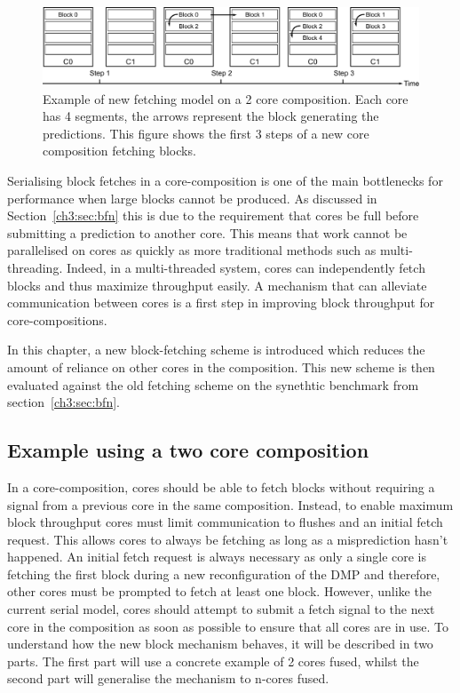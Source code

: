 \begin{figure}[t]
    \centering
    \includegraphics[width=1\textwidth]{chapter3/graphics/fetching-model.pdf}

    \caption{Example of new fetching model on a 2 core composition. Each core has 4 segments, the arrows represent the block generating the predictions. This figure shows the first 3 steps of a new core composition fetching blocks.}
    \label{fig:new_fetch_ex}
\end{figure}

Serialising block fetches in a core-composition is one of the main bottlenecks for performance when large blocks cannot be produced.
As discussed in Section~\ref{ch3:sec:bfn} this is due to the requirement that cores be full before submitting a prediction to another core.
This means that work cannot be parallelised on cores as quickly as more traditional methods such as multi-threading.
Indeed, in a multi-threaded system, cores can independently fetch blocks and thus maximize throughput easily.
A mechanism that can alleviate communication between cores is a first step in improving block throughput for core-compositions.

In this chapter, a new block-fetching scheme is introduced which reduces the amount of reliance on other cores in the composition.
This new scheme is then evaluated against the old fetching scheme on the synethtic benchmark from section~\ref{ch3:sec:bfn}.

\subsection{Example using a two core composition}

In a core-composition, cores should be able to fetch blocks without requiring a signal from a previous core in the same composition.
Instead, to enable maximum block throughput cores must limit communication to flushes and an initial fetch request.
This allows cores to always be fetching as long as a misprediction hasn't happened.
An initial fetch request is always necessary as only a single core is fetching the first block during a new reconfiguration of the DMP and therefore, other cores must be prompted to fetch at least one block.
However, unlike the current serial model, cores should attempt to submit a fetch signal to the next core in the composition as soon as possible to ensure that all cores are in use.
To understand how the new block mechanism behaves, it will be described in two parts.
The first part will use a concrete example of 2 cores fused, whilst the second part will generalise the mechanism to n-cores fused.

